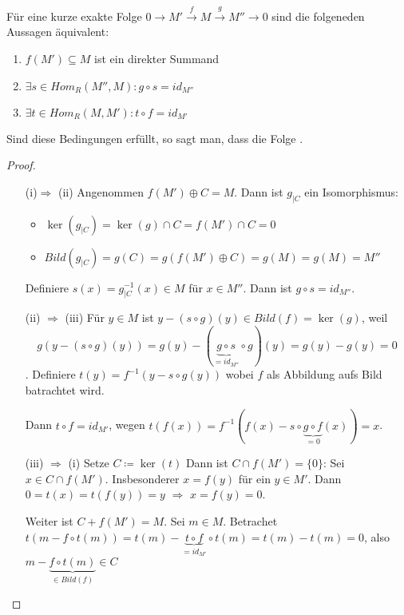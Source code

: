 \documentclass[../main.tex]{subfiles}
\begin{document}
\begin{theorem}%
    Für eine kurze exakte Folge $0\rightarrow M'\overset{f}{\rightarrow} M \overset{g}{\rightarrow} M'' \rightarrow 0$ sind die folgeneden Aussagen äquivalent:
    \begin{enumerate}[label=(\roman*)]
        \item $f(M')\subseteq M$ ist ein direkter Summand
        \item $\exists s\in Hom_R(M'',M): g\circ s = id_{M''}$
        \item $\exists t\in Hom_R(M,M'): t\circ f = id_{M'}$
    \end{enumerate}
    Sind diese Bedingungen erfüllt, so sagt man, dass die Folge .
\end{theorem}
\begin{proof}$ $
    \begin{itemize}
        \item[(i)$\Rightarrow$ (ii)]
        Angenommen $f(M')\oplus C = M$.
        Dann ist $g_{|C}$ ein Isomorphismus:
        \begin{itemize}[noitemsep]
            \item $\ker(g_{|C}) = \ker{(g)}\cap C = f(M')\cap C = 0$
            \item $Bild(g_{|C}) = g(C) = g(f(M')\oplus C) = g(M) = g(M) = M''$
        \end{itemize}
        Definiere $s(x) = g_{|C}^{-1}(x)\in M$ für $x\in M''$.
        Dann ist $g\circ s = id_{M''}$.
        \item[(ii) $\Rightarrow$ (iii)]
        Für $y\in M$ ist $y-(s\circ g) (y) \in Bild(f) = \ker(g)$, weil $$g(y-(s\circ g) (y)) = g(y)- (\underbrace{g\circ s}_{= id_{M''}}\circ g) (y) = g(y) - g(y) = 0$$.
        Definiere $t(y) = f^{-1}(y- s\circ g (y))$ wobei $f$ als Abbildung aufs Bild batrachtet wird.
        
        Dann $t\circ f = id_{M'}$, wegen
        $t(f(x)) = f^{-1}(f(x) - s\circ \underbrace{g \circ f}_{ = 0} (x)) = x$.
        \item[(iii) $\Rightarrow$ (i)]
        Setze $C\coloneqq \ker(t)$
        Dann ist $C\cap f(M') = \{0\}$: Sei $x\in C\cap f(M')$.
        Insbesonderer $x=f(y)$ für ein $y\in M'$. Dann $0 = t(x) = t(f(y)) = y$ $\Longrightarrow$ $x = f(y) = 0$.

        Weiter ist $C+f(M') = M$. Sei $m\in M$.
        Betrachet $t(m-f\circ t(m)) = t(m) - \underbrace{t\circ f}_{=id_{M'}} \circ t(m) = t(m)-t(m) = 0$, also $m-\underbrace{f\circ t(m)}_{\in Bild(f)} \in C$
    \end{itemize}
\end{proof}
\end{document}
